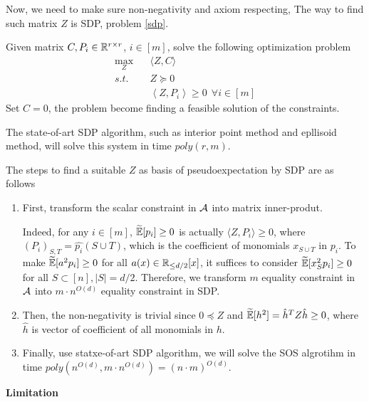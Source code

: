 Now, we need to make sure non-negativity and axiom respecting, The way to find such matrix $Z$ is SDP, problem \ref{sdp}.
\begin{prob}
    \label{sdp}
    Given matrix $C, P_i\in\mathbb{R}^{r\times r}$, $i\in[m]$, solve the following optimization problem
    \begin{equation}
    \begin{split}
        \max_Z~~~~&\langle Z,C\rangle \\
        s.t.~~~~ &Z \succeq 0\\
        &\left\langle Z, P_i\right\rangle\ge 0~~\forall i\in[m]
    \end{split}
    \end{equation}
    Set $C=0$, the problem become finding a feasible solution of the constraints.
\end{prob}
The state-of-art SDP algorithm, such as interior point method and epllisoid method, will solve this system in time $poly(r,m)$.

The steps to find a suitable $Z$ as basis of pseudoexpectation by SDP are as follows
\begin{enumerate}
    \item First, transform the scalar constraint in $\mathcal{A}$ into matrix inner-produt.
    
    Indeed, for any $i\in[m]$, $\widetilde{\mathbb{E}}[p_i]\ge 0$ is actually $\langle Z, P_i \rangle \ge 0$, where $(P_i)_{S,T} = \hat{p_i}(S\cup T)$, which is the coefficient of monomials $x_{S\cup T}$ in $p_i$. To make $\widetilde{\mathbb{E}}[a^2 p_i]\ge0$ for all $a(x)\in\mathbb{R}_{\le d/2}[x]$, it suffices to consider $\widetilde{\mathbb{E}}[x_S^2 p_i]\ge 0$ for all $S\subset[n],|S|=d/2$. Therefore, we transform $m$ equality constraint in $\mathcal{A}$ into $m\cdot n^{O(d)}$ equality constraint in SDP.

    \item Then, the non-negativity is trivial since $0\preccurlyeq Z$ and $\widetilde{\mathbb{E}}[h^2]= \hat{h}^T Z \hat{h}\ge 0$, where $\hat{h}$ is vector of coefficient of all monomials in $h$. 
    
    \item Finally, use statxe-of-art SDP algorithm, we will solve the SOS algrotihm in time $poly(n^{O(d)}, m\cdot n^{O(d)}) = (n\cdot m)^{O(d)}$.
\end{enumerate}


\bigskip

\textbf{Limitation}

